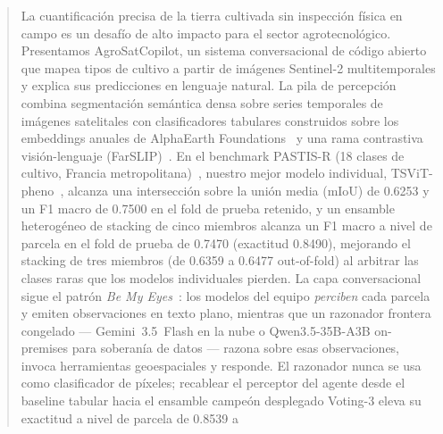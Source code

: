 \begin{abstract}
La cuantificación precisa de la tierra cultivada sin inspección física
en campo es un desafío de alto impacto para el sector agrotecnológico.
Presentamos AgroSatCopilot, un sistema conversacional de código abierto
que mapea tipos de cultivo a partir de imágenes Sentinel-2
multitemporales y explica sus predicciones en lenguaje natural. La pila
de percepción combina segmentación semántica densa sobre series
temporales de imágenes satelitales con clasificadores tabulares
construidos sobre los embeddings anuales de AlphaEarth
Foundations~\cite{brown2025alphaearth} y una rama contrastiva
visión-lenguaje (FarSLIP)~\cite{li2025farslip}. En el benchmark PASTIS-R
(18 clases de cultivo, Francia
metropolitana)~\cite{garnot2021pastis}, nuestro mejor modelo individual,
TSViT-pheno~\cite{tarasiou2023tsvit}, alcanza una intersección sobre la
unión media (mIoU) de 0.6253 y un F1 macro de 0.7500 en el fold de
prueba retenido, y un ensamble heterogéneo de stacking de cinco miembros
alcanza un F1 macro a nivel de parcela en el fold de prueba de 0.7470
(exactitud 0.8490), mejorando el stacking de tres miembros (de 0.6359 a
0.6477 out-of-fold) al arbitrar las clases raras que los modelos
individuales pierden.
La capa conversacional sigue el
patrón \emph{Be My Eyes}~\cite{huang2025bemyeyes}: los modelos del equipo
\emph{perciben} cada parcela y emiten observaciones en texto plano,
mientras que un razonador frontera congelado --- Gemini~3.5~Flash en la
nube o Qwen3.5-35B-A3B on-premises para soberanía de datos --- razona
sobre esas observaciones, invoca herramientas geoespaciales y responde.
El razonador nunca se usa como clasificador de píxeles; recablear el
perceptor del agente desde el baseline tabular hacia el ensamble campeón
desplegado Voting-3 eleva su exactitud a nivel de parcela de 0.8539 a

\end{abstract}
